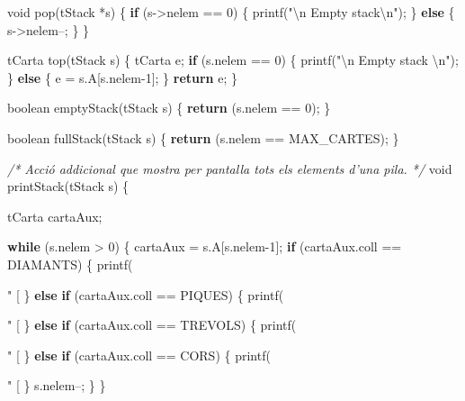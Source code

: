 \documentclass[]{book}
\newenvironment{Shaded}{\begin{snugshade}}{\end{snugshade}}
\newcommand{\DataTypeTok}[1]{\textcolor[rgb]{0.13,0.29,0.53}{#1}}
\newcommand{\DecValTok}[1]{\textcolor[rgb]{0.00,0.00,0.81}{#1}}
\newcommand{\SpecialCharTok}[1]{\textcolor[rgb]{0.00,0.00,0.00}{#1}}
\newcommand{\StringTok}[1]{\textcolor[rgb]{0.31,0.60,0.02}{#1}}
\newcommand{\CommentTok}[1]{\textcolor[rgb]{0.56,0.35,0.01}{\textit{#1}}}
\newcommand{\ControlFlowTok}[1]{\textcolor[rgb]{0.13,0.29,0.53}{\textbf{#1}}}
\newcommand{\NormalTok}[1]{#1}
\begin{document}
\begin{Shaded}
\begin{Highlighting}[]
\DataTypeTok{void}\NormalTok{ pop(tStack *s) \{}
    \ControlFlowTok{if}\NormalTok{ (s->nelem == }\DecValTok{0}\NormalTok{) \{}
\NormalTok{        printf(}\StringTok{"}\SpecialCharTok{\textbackslash{}n}\StringTok{ Empty stack}\SpecialCharTok{\textbackslash{}n}\StringTok{"}\NormalTok{);}
\NormalTok{    \} }\ControlFlowTok{else}\NormalTok{ \{}
\NormalTok{        s->nelem--;}
\NormalTok{    \}}
\NormalTok{\}}

\NormalTok{tCarta top(tStack s) \{}
\NormalTok{    tCarta e;}
    \ControlFlowTok{if}\NormalTok{ (s.nelem == }\DecValTok{0}\NormalTok{) \{}
\NormalTok{        printf(}\StringTok{"}\SpecialCharTok{\textbackslash{}n}\StringTok{ Empty stack }\SpecialCharTok{\textbackslash{}n}\StringTok{"}\NormalTok{);}
\NormalTok{    \} }\ControlFlowTok{else}\NormalTok{ \{}
\NormalTok{        e = s.A[s.nelem-}\DecValTok{1}\NormalTok{];}
\NormalTok{    \}}
    \ControlFlowTok{return}\NormalTok{ e;}
\NormalTok{\}}

\NormalTok{boolean emptyStack(tStack s) \{}
    \ControlFlowTok{return}\NormalTok{ (s.nelem == }\DecValTok{0}\NormalTok{);}
\NormalTok{\}}

\NormalTok{boolean fullStack(tStack s) \{}
    \ControlFlowTok{return}\NormalTok{ (s.nelem == MAX_CARTES);}
\NormalTok{\}}

\CommentTok{/* Acció addicional que mostra per pantalla tots }
\CommentTok{   els elements d'una pila. */}
\DataTypeTok{void}\NormalTok{ printStack(tStack s) \{}
    
\NormalTok{    tCarta cartaAux;}
    
    \ControlFlowTok{while}\NormalTok{ (s.nelem > }\DecValTok{0}\NormalTok{) \{}
\NormalTok{        cartaAux = s.A[s.nelem-}\DecValTok{1}\NormalTok{]; }
        \ControlFlowTok{if}\NormalTok{ (cartaAux.coll == DIAMANTS) \{}
\NormalTok{            printf(}\StringTok{"  [%
\NormalTok{        \} }\ControlFlowTok{else} \ControlFlowTok{if}\NormalTok{ (cartaAux.coll == PIQUES) \{}
\NormalTok{            printf(}\StringTok{"  [%
\NormalTok{        \} }\ControlFlowTok{else} \ControlFlowTok{if}\NormalTok{ (cartaAux.coll == TREVOLS) \{}
\NormalTok{            printf(}\StringTok{"  [%
\NormalTok{        \} }\ControlFlowTok{else} \ControlFlowTok{if}\NormalTok{ (cartaAux.coll == CORS) \{}
\NormalTok{            printf(}\StringTok{"  [%
\NormalTok{        \}}
\NormalTok{        s.nelem--;}
\NormalTok{    \}}
\NormalTok{\}}

}}}}
\end{Highlighting}
\end{Shaded}
\end{document}

